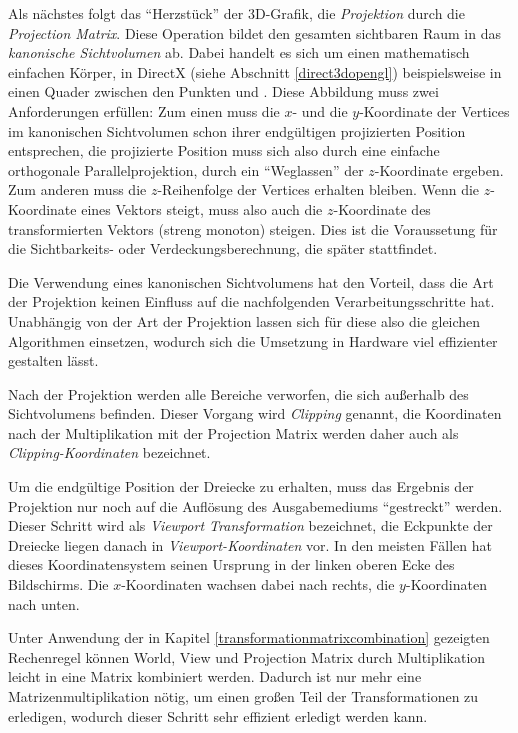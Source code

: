 Als nächstes folgt das \enquote{Herzstück} der 3D-Grafik, die \emph{Projektion} durch die \emph{Projection Matrix}. Diese Operation bildet den gesamten sichtbaren Raum in das \emph{kanonische Sichtvolumen} ab. Dabei handelt es sich um einen mathematisch einfachen Körper, in DirectX (siehe Abschnitt \ref{direct3dopengl}) beispielsweise in einen Quader zwischen den Punkten  und . Diese Abbildung muss zwei Anforderungen erfüllen: Zum einen muss die $x$- und die $y$-Koordinate der Vertices im kanonischen Sichtvolumen schon ihrer endgültigen projizierten Position entsprechen, die projizierte Position muss sich also durch eine einfache orthogonale Parallelprojektion, durch ein \enquote{Weglassen} der $z$-Koordinate ergeben. Zum anderen muss die $z$-Reihenfolge der Vertices erhalten bleiben. Wenn die $z$-Koordinate eines Vektors steigt, muss also auch die $z$-Koordinate des transformierten Vektors (streng monoton) steigen. Dies ist die Voraussetung für die Sichtbarkeits- oder Verdeckungsberechnung, die später stattfindet.

Die Verwendung eines kanonischen Sichtvolumens hat den Vorteil, dass die Art der Projektion keinen Einfluss auf die nachfolgenden Verarbeitungsschritte hat. Unabhängig von der Art der Projektion lassen sich für diese also die gleichen Algorithmen einsetzen, wodurch sich die Umsetzung in Hardware viel effizienter gestalten lässt.

Nach der Projektion werden alle Bereiche verworfen, die sich außerhalb des Sichtvolumens befinden. Dieser Vorgang wird \emph{Clipping} genannt, die Koordinaten nach der Multiplikation mit der Projection Matrix werden daher auch als \emph{Clipping-Koordinaten} bezeichnet.

Um die endgültige Position der Dreiecke zu erhalten, muss das Ergebnis der Projektion nur noch auf die Auflösung des Ausgabemediums \enquote{gestreckt} werden. Dieser Schritt wird als \emph{Viewport Transformation} bezeichnet, die Eckpunkte der Dreiecke liegen danach in \emph{Viewport-Koordinaten} vor. In den meisten Fällen hat dieses Koordinatensystem seinen Ursprung in der linken oberen Ecke des Bildschirms. Die $x$-Koordinaten wachsen dabei nach rechts, die $y$-Koordinaten nach unten.

Unter Anwendung der in Kapitel \ref{transformationmatrixcombination} gezeigten Rechenregel können World, View und Projection Matrix durch Multiplikation leicht in eine Matrix kombiniert werden. Dadurch ist nur mehr eine Matrizenmultiplikation nötig, um einen großen Teil der Transformationen zu erledigen, wodurch dieser Schritt sehr effizient erledigt werden kann.

